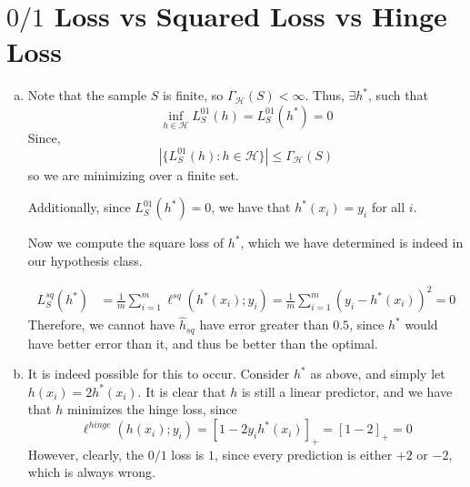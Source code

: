 \documentclass{amsart}
\newcommand{\cH}{\mathcal{H}}
\theoremstyle{definition}
\begin{document}
\section{$0/1$ Loss vs Squared Loss vs Hinge Loss}
\begin{enumerate}[(a)]
  \item 
    Note that the sample $S$ is finite, so $\Gamma_\cH(S) < \infty$. Thus, $\exists h^\ast$, such that 
    \[
      \inf_{h \in \cH} L_S^{01}(h) = L_S^{01}(h^\ast) = 0
    \]
    Since, 
    \[
      |\{L_S^{01}(h) : h \in \cH\}|\le \Gamma_\cH(S)
    \]
    so we are minimizing over a finite set. 
    
    Additionally, since $L_S^{01}(h^\ast) = 0$, we have that $h^\ast(x_i) = y_i$ for all $i$. 

    Now we compute the square loss of $h^\ast$, which we have determined is indeed in our hypothesis class. 

    \begin{align*}
      L_S^{sq}(h^\ast) &= \frac{1}{m }\displaystyle\sum_{i = 1}^{m }\ell^{sq}(h^\ast (x_i);y_i) = \frac{1}{m }\displaystyle\sum_{i = 1}^{m }(y_i - h^\ast(x_i))^2 = 0
    \end{align*}
    Therefore, we cannot have $\hat{h}_{sq}$ have error greater than $0.5$, since $h^\ast$ would have better error than it, and thus be better than the optimal. 
  \item 
    It is indeed possible for this to occur. Consider $h^\ast$ as above, and simply let $h(x_i) = 2 h^\ast(x_i)$. It is clear that $h$ is still a linear predictor, and we have that $h$ minimizes the hinge loss, since 
    \[
      \ell^{hinge}(h(x_i); y_i)= [1 - 2y_ih^\ast(x_i)]_+ = [1 - 2]_+ = 0
    \]
    However, clearly, the $0/1$ loss is $1$, since every prediction is either $+2$ or $-2$, which is always wrong.
\end{enumerate}
\end{document}
